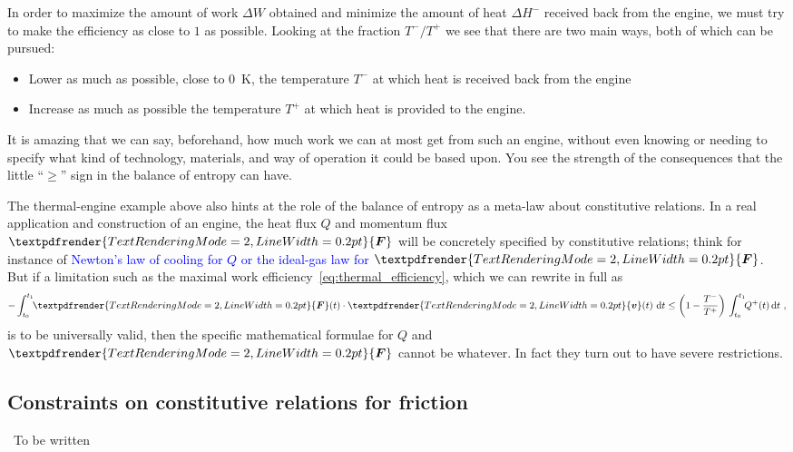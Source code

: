 \documentclass[a4paper,12pt,%
onecolumn,oneside,%
british%
]{memoir}
\renewcommand*{\bm}[1]{\textpdfrender{TextRenderingMode=2,LineWidth=0.2pt}{\boldsymbol{#1}}}
\newcommand{\mynotew}[1]{{\footnotesize\color{midgrey}\faIcon{tools}\ #1}}
\newcommand*{\di}{\mathrm{d}}%
\newcommand*{\incr}{\Delta}%
\renewcommand*{\|}[1][]{\nonscript\:#1\vert\nonscript\:\mathopen{}}
\newcommand*{\sect}{\S}%
\renewcommand*{\autoref}[2]{\sidepar{\vspace{-1ex}\footnotesize{\color{blue}\faIcon{%
angle-right%
}\enspace\sect~\ref{#1} page~\pageref{#1}}}\textcolor{blue}{#2}}
\newcommand*{\yv}{\bm{v}}
\newcommand*{\yti}{t_{0}}
\newcommand*{\ytf}{t_{1}}
\newcommand*{\yQ}{Q}%
\newcommand*{\yQp}{Q^{+}}%
\newcommand*{\yhem}{\incr H^{-}}%
\newcommand*{\yW}{\incr W}%
\newcommand*{\yF}{\bm{F}}
\newcommand*{\yT}{T}%
\newcommand*{\yTp}{\yT^{+}}%
\newcommand*{\yTm}{\yT^{-}}%
\begin{document}
In order to maximize the amount of work $\yW$ obtained and minimize the amount of heat $\yhem$ received back from the engine, we must try to make the efficiency as close to $1$ as possible. Looking at the fraction $\yTm/\yTp$ we see that there are two main ways, both of which can be pursued:
\begin{itemize}
\item Lower as much as possible, close to \qty{0}{K}, the temperature $\yTm$ at which heat is received back from the engine
\item Increase as much as possible the temperature $\yTp$ at which heat is provided to the engine.
\end{itemize}

\medskip

It is amazing that we can say, beforehand, how much work we can at most get from such an engine, without even knowing or needing to specify what kind of technology, materials, and way of operation it could be based upon. You see the strength of the consequences that the little \enquote{$\ge$} sign in the balance of entropy can have.

The thermal-engine example above also hints at the role of the balance of entropy as a meta-law about constitutive relations. In a real application and construction of an engine, the heat flux $\yQ$ and momentum flux $\yF$ will be concretely specified by constitutive relations; think for instance of \autoref{sec:int_energy_idealgas}{Newton's law of cooling for $\yQ$ or the ideal-gas law for $\yF$}. But if a limitation such as the maximal work efficiency~\eqref{eq:thermal_efficiency}, which we can rewrite in full as
\begin{equation*}
  -\int_{\yti}^{\ytf}\!\!\yF(t)\cdot\yv(t)\ \di t
  \le
  \biggl(1-\frac{\yTm}{\yTp}\biggr)\,
  \int_{\yti}^{\ytf}\!\!\yQp(t)\,\di t \ ,
\end{equation*}
is to be universally valid, then the specific mathematical formulae for $\yQ$ and $\yF$ cannot be whatever. In fact they turn out to have severe restrictions.


\subsection{Constraints on constitutive relations for friction}
\label{sec:friction_entropy}
\mynotew{To be written}



\end{document}
